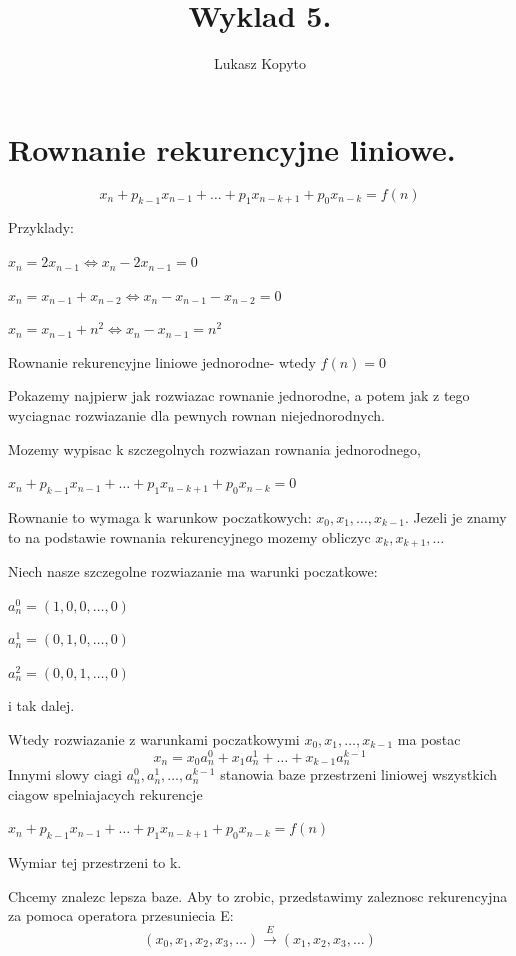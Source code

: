 \documentclass{article}
\author{Lukasz Kopyto}
\title{Wyklad 5.}
\begin{document}
\maketitle


\section*{Rownanie rekurencyjne liniowe.}

$$x_{n} + p_{k-1}x_{n-1} + \dots + p_{1}x_{n-k+1} + p_{0}x_{n-k} = f(n)$$

Przyklady:

$x_{n} = 2x_{n-1} \iff x_{n} - 2x_{n-1} = 0$

$x_{n} = x_{n-1} + x_{n-2} \iff x_{n} - x_{n-1} - x_{n-2} = 0$

$x_{n} = x_{n-1} + n^{2} \iff x_{n} - x_{n-1} = n^{2}$

Rownanie rekurencyjne liniowe jednorodne- wtedy $f(n) = 0$

Pokazemy najpierw jak rozwiazac rownanie jednorodne, a potem jak z tego wyciagnac rozwiazanie dla pewnych rownan niejednorodnych.

Mozemy wypisac k szczegolnych rozwiazan rownania jednorodnego,

$x_{n} + p_{k-1}x_{n-1} + \dots + p_{1}x_{n-k+1} + p_{0}x_{n-k} = 0$

Rownanie to wymaga k warunkow poczatkowych: $x_{0}, x_{1}, \dots, x_{k-1}$.
Jezeli je znamy to na podstawie rownania rekurencyjnego mozemy obliczyc $x_{k}, x_{k+1}, \dots$

Niech nasze szczegolne rozwiazanie ma warunki poczatkowe:

$a_{n}^{0} = (1,0,0,\dots,0)$

$a_{n}^{1} = (0,1,0,\dots,0)$

$a_{n}^{2} = (0,0,1,\dots,0)$

i tak dalej.

Wtedy rozwiazanie z warunkami poczatkowymi $x_{0}, x_{1}, \dots, x_{k-1}$ ma postac
$$x_{n} = x_{0}a_{n}^{0} + x_{1}a_{n}^{1} + \dots + x_{k-1}a_{n}^{k-1}$$
Innymi slowy ciagi $a_{n}^{0}, a_{n}^{1}, \dots, a_{n}^{k-1}$ stanowia baze przestrzeni liniowej wszystkich ciagow spelniajacych rekurencje

$x_{n} + p_{k-1}x_{n-1} + \dots + p_{1}x_{n-k+1} + p_{0}x_{n-k} = f(n)$

Wymiar tej przestrzeni to k.

Chcemy znalezc lepsza baze. Aby to zrobic, przedstawimy zaleznosc rekurencyjna za pomoca operatora przesuniecia E:
$$(x_{0}, x_{1}, x_{2}, x_{3}, \dots) \overset{E}{\longrightarrow} (x_{1}, x_{2}, x_{3}, \dots)$$
\end{document}
